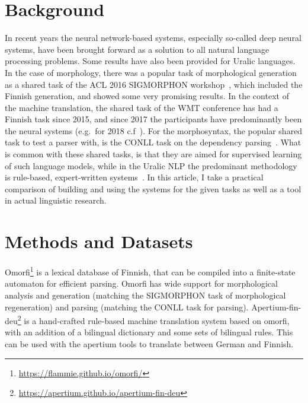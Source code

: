 \documentclass{flammie}
\begin{document}
\section{Background}
\label{sec:background}

In recent years the neural network-based systems, especially so-called deep
neural systems, have been brought forward as a solution to all natural language
processing problems. Some results have also been provided for Uralic languages.
In the case of morphology, there was a popular task of morphological generation
as a shared task of the ACL 2016 SIGMORPHON
workshop~\citep{cotterell2016sigmorphon}, which included the Finnish generation,
and showed some very promising results. In the context of the machine
translation, the shared task of the WMT conference has had a Finnish task since
2015, and since 2017 the participants have predominantly been the neural systems
(e.g.\ for 2018 c.f~\citet{wmt2018findings}).  For the morphosyntax, the popular
shared task to test a parser with, is the CONLL task on the dependency
parsing~\citep{zeman2018conll}.  What is common with these shared tasks, is that
they are aimed for supervised learning of such language models, while in the
Uralic NLP the predominant methodology is rule-based, expert-written
systems~\citep{moshagen2014open}. In this article, I take a practical comparison
of building and using the systems for the given tasks as well as a tool in
actual linguistic research.

\section{Methods and Datasets}
\label{sec:methods}

Omorfi\footnote{\url{https://flammie.github.io/omorfi/}} is a lexical database
of Finnish, that can be compiled into a finite-state automaton for efficient
parsing.  Omorfi has wide support for morphological analysis and generation
(matching the SIGMORPHON task of morphological regeneration) and parsing
(matching the CONLL task for parsing).
Apertium-fin-deu\footnote{\url{https://apertium.github.io/apertium-fin-deu}} is
a hand-crafted rule-based machine translation system based on omorfi, with an
addition of a bilingual dictionary and some sets of bilingual rules. This can be
used with the apertium tools to translate between German and Finnish.
\end{document}
